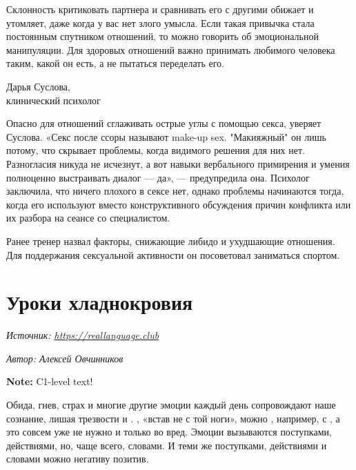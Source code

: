 \begin{fancyquotes}
    Склонность критиковать партнера и сравнивать его с другими обижает и утомляет, даже когда у вас нет злого умысла. Если такая привычка стала постоянным спутником отношений, то можно говорить об эмоциональной манипуляции. Для здоровых отношений важно принимать любимого человека таким, какой он есть, а не пытаться переделать его.

    \begin{flushright}
        Дарья Суслова,\\
        клинический психолог
    \end{flushright}
\end{fancyquotes}

Опасно для отношений сглаживать острые углы с помощью секса, уверяет Суслова. «Секс после ссоры называют make-up sex. "Макияжный" он лишь потому, что скрывает проблемы, когда видимого решения для них нет. Разногласия никуда не исчезнут, а вот навыки вербального примирения и умения полноценно выстраивать диалог — да», — предупредила она. Психолог заключила, что ничего плохого в сексе нет, однако проблемы начинаются тогда, когда его используют вместо конструктивного обсуждения причин конфликта или их разбора на сеансе со специалистом.

Ранее тренер назвал факторы, снижающие либидо и ухудшающие отношения. Для поддержания сексуальной активности он посоветовал заниматься спортом.




\newpage
\section{Уроки хладнокровия}

\textit{Источник: \url{https://reallanguage.club}}


\textit{Автор: Алексей Овчинников}

\textbf{Note:} C1-level text!

Обида, гнев, страх и многие другие эмоции каждый день сопровождают наше сознание, лишая  трезвости и . , «встав не с той ноги», можно  , например, с , а это совсем уже не нужно и только во вред. Эмоции вызываются поступками, действиями, но, чаще всего, словами. И теми же поступками, действиями и словами можно  негативу позитив.

